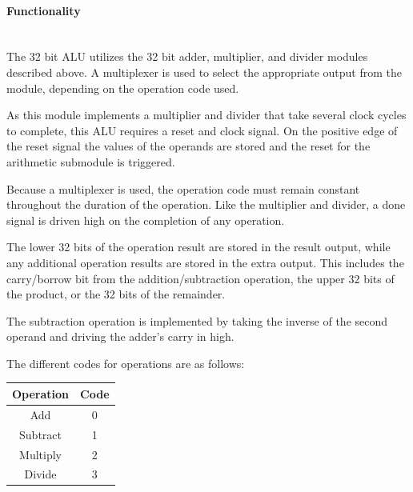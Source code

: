 \documentclass{article}
\begin{document}
    \paragraph{Functionality}
    \hfill\\
    The 32 bit ALU utilizes the 32 bit adder, multiplier, and divider modules
    described above. A multiplexer is used to select the appropriate output
    from the module, depending on the operation code used.

    As this module implements a multiplier and divider that take several
    clock cycles to complete, this ALU requires a reset and clock signal.
    On the positive edge of the reset signal the values of the operands
    are stored and the reset for the arithmetic submodule is triggered.

    Because a multiplexer is used, the operation code must remain constant
    throughout the duration of the operation. Like the multiplier and
    divider, a done signal is driven high on the completion of any operation.

    The lower 32 bits of the operation result are stored in the result output,
    while any additional operation results are stored in the extra output.
    This includes the carry/borrow bit from the addition/subtraction
    operation, the upper 32 bits of the product, or the 32 bits of the
    remainder.

    The subtraction operation is implemented by taking the inverse of the
    second operand and driving the adder's carry in high.

    The different codes for operations are as follows:

    \begin{center}
        \begin{tabular}{|c|c|}
            \hline
            Operation & Code
            \\\hline\hline
            Add & 0
            \\\hline
            Subtract & 1
            \\\hline
            Multiply & 2
            \\\hline
            Divide & 3
            \\\hline
        \end{tabular}
    \end{center}
\end{document}
